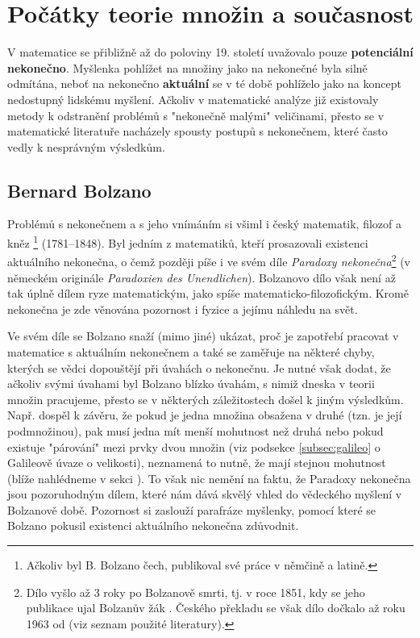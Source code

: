 \section{Počátky teorie množin a současnost}

V matematice se přibližně až do poloviny 19. století uvažovalo pouze \textbf{potenciální nekonečno}. Myšlenka pohlížet na množiny jako na nekonečné byla silně odmítána, neboť na nekonečno \textbf{aktuální} se v té době pohlíželo jako na koncept nedostupný lidskému myšlení. Ačkoliv v matematické analýze již existovaly metody k odstranění problémů s "nekonečně malými" veličinami, přesto se v matematické literatuře nacházely spousty postupů s nekonečnem, které často vedly k nesprávným výsledkům.
\subsection{Bernard Bolzano}\label{subsec:bolzano}
Problémů s nekonečnem a s jeho vnímáním si všiml i český matematik, filozof a kněz \footnote{Ačkoliv byl B. Bolzano čech, publikoval své práce v němčině a latině.} (1781--1848). Byl jedním z matematiků, kteří prosazovali existenci aktuálního nekonečna, o čemž později píše i ve svém díle \emph{Paradoxy nekonečna}\footnote{Dílo vyšlo až 3 roky po Bolzanově smrti, tj. v roce 1851, kdy se jeho publikace ujal Bolzanův žák . Českého překladu se však dílo dočkalo až roku 1963 od  (viz seznam použité literatury).} (v německém originále \emph{Paradoxien des Unendlichen}). Bolzanovo dílo však není až tak úplně dílem ryze matematickým, jako spíše matematicko-filozofickým. Kromě nekonečna je zde věnována pozornost i fyzice a jejímu náhledu na svět.

Ve svém díle se Bolzano snaží (mimo jiné) ukázat, proč je zapotřebí pracovat v matematice s aktuálním nekonečnem a také se zaměřuje na některé chyby, kterých se vědci dopouštějí při úvahách o nekonečnu. Je nutné však dodat, že ačkoliv svými úvahami byl Bolzano blízko úvahám, s nimiž dneska v teorii množin pracujeme, přesto se v některých záležitostech došel k jiným výsledkům. Např. dospěl k závěru, že pokud je jedna množina obsažena v druhé (tzn. je její podmnožinou), pak musí jedna mít menší mohutnost než druhá nebo pokud existuje "párování" mezi prvky dvou množin (viz podsekce \ref{subsec:galileo}
o Galileově úvaze o velikosti), neznamená to nutně, že mají stejnou mohutnost (blíže nahlédneme v sekci ). To však nic nemění na faktu, že Paradoxy nekonečna jsou pozoruhodným dílem, které nám dává skvělý vhled do vědeckého myšlení v Bolzanově době. Pozornost si zaslouží parafráze myšlenky, pomocí které se Bolzano pokusil existenci aktuálního nekonečna zdůvodnit.

